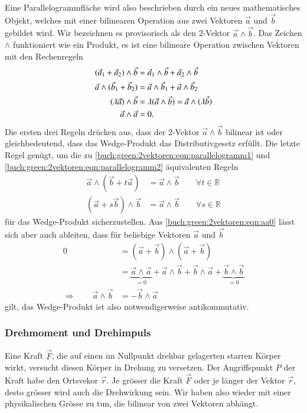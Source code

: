 Eine Parallelogrammfläche wird also beschrieben durch ein neues
mathematisches Objekt, welches mit einer bilinearen Operation aus
zwei Vektoren $\vec{a}$ und $\vec{b}$ gebildet wird.
Wir bezeichnen es provisorisch als den 2-Vektor $\vec{a}\wedge\vec{b}$.
Das Zeichen $\wedge$ funktioniert wie ein Produkt, es ist eine 
bilineare Operation zwischen Vektoren mit den Rechenregeln
\begin{align}
(\vec{a}_1+\vec{a}_2)\wedge\vec{b}
&=
\vec{a}_1\wedge\vec{b}+\vec{a}_2\wedge\vec{b}
\notag
\\
\vec{a}\wedge(\vec{b}_1+\vec{b}_2)
&=
\vec{a}\wedge\vec{b}_1 + \vec{a}\wedge\vec{b}_2
\notag
\\
(\lambda\vec{a})\wedge\vec{b}
&=
\lambda(\vec{a}\wedge\vec{b})=\vec{a}\wedge(\lambda\vec{b})
\notag
\\
\vec{a}\wedge\vec{a}&=0.
\label{buch:green:2vektoren:eqn:aa0}
\end{align}
Die ersten drei Regeln drücken aus, dass der 2-Vektor $\vec{a}\wedge\vec{b}$
bilinear ist oder gleichbedeutend, dass das Wedge-Produkt das
Distributivgesetz erfüllt.
Die letzte Regel genügt, um die zu
\eqref{buch:green:2vektoren:eqn:parallelogramm1}
und
\eqref{buch:green:2vektoren:eqn:parallelogramm2}
äquivalenten Regeln
\begin{equation}
\begin{aligned}
\vec{a}\wedge(\vec{b}+t\vec{a})
&=
\vec{a}\wedge\vec{b}
\qquad \forall t\in\mathbb{R}
\\
(\vec{a}+s\vec{b})\wedge\vec{b}
&=
\vec{a}\wedge\vec{b}
\qquad \forall s\in\mathbb{R}
\end{aligned}
\label{buch:green:2vektoren:eqn:grundeigenschaft}
\end{equation}
für das Wedge-Produkt sicherzustellen.
Aus \eqref{buch:green:2vektoren:eqn:aa0} lässt sich aber auch
ableiten, dass für beliebige Vektoren $\vec{a}$ und $\vec{b}$
\begin{align*}
0
&=
(\vec{a}+\vec{b})\wedge(\vec{a}+\vec{b})
\\
&=
\underbrace{\vec{a}\wedge\vec{a}}_{\displaystyle=0}
+
\vec{a}\wedge\vec{b}
+
\vec{b}\wedge\vec{a}
+
\underbrace{\vec{b}\wedge\vec{b}}_{\displaystyle=0}
\\
\Rightarrow\qquad
\vec{a}\wedge\vec{b}
&=
-\vec{b}\wedge\vec{a}
\end{align*}
gilt, das Wedge-Produkt ist also notwendigerweise antikommutativ.
%

%
%
\subsubsection{Drehmoment und Drehimpuls}
%
%
Eine Kraft $\vec{F}$, die auf einen im Nullpunkt drehbar gelagerten
starren Körper wirkt, versucht diesen Körper in Drehung zu versetzen.
Der Angriffspunkt $P$ der Kraft habe den Ortsvekor $\vec{r}$.
Je grösser die Kraft $\vec{F}$ oder je länger der Vektor $\vec{r}$,
desto grösser wird auch die Drehwirkung sein.
Wir haben also wieder mit einer physikalischen Grösse zu tun, die
bilinear von zwei Vektoren abhängt.

